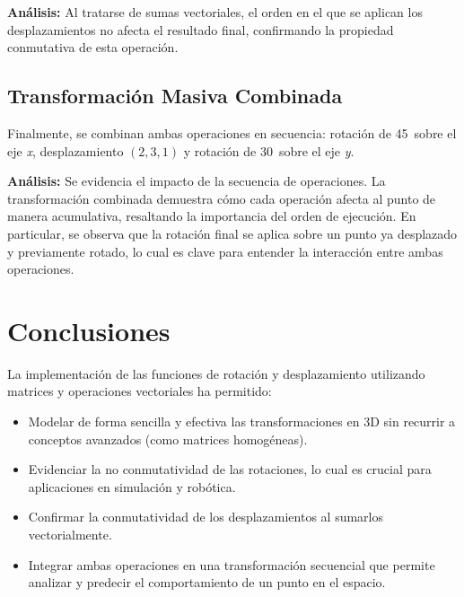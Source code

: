 \documentclass[a4paper, 10pt]{article}
\begin{document}
\textbf{Análisis:}  
Al tratarse de sumas vectoriales, el orden en el que se aplican los desplazamientos no afecta el resultado final, confirmando la propiedad conmutativa de esta operación.

\subsection{Transformación Masiva Combinada}
Finalmente, se combinan ambas operaciones en secuencia: rotación de 45\textdegree~sobre el eje \textit{x}, desplazamiento $(2,3,1)$ y rotación de 30\textdegree~sobre el eje \textit{y}.

\textbf{Análisis:}  
Se evidencia el impacto de la secuencia de operaciones. La transformación combinada demuestra cómo cada operación afecta al punto de manera acumulativa, resaltando la importancia del orden de ejecución. En particular, se observa que la rotación final se aplica sobre un punto ya desplazado y previamente rotado, lo cual es clave para entender la interacción entre ambas operaciones.

\section{Conclusiones}
La implementación de las funciones de rotación y desplazamiento utilizando matrices y operaciones vectoriales ha permitido:
\begin{itemize}
    \item Modelar de forma sencilla y efectiva las transformaciones en 3D sin recurrir a conceptos avanzados (como matrices homogéneas).
    \item Evidenciar la no conmutatividad de las rotaciones, lo cual es crucial para aplicaciones en simulación y robótica.
    \item Confirmar la conmutatividad de los desplazamientos al sumarlos vectorialmente.
    \item Integrar ambas operaciones en una transformación secuencial que permite analizar y predecir el comportamiento de un punto en el espacio.
\end{itemize}
\end{document}
